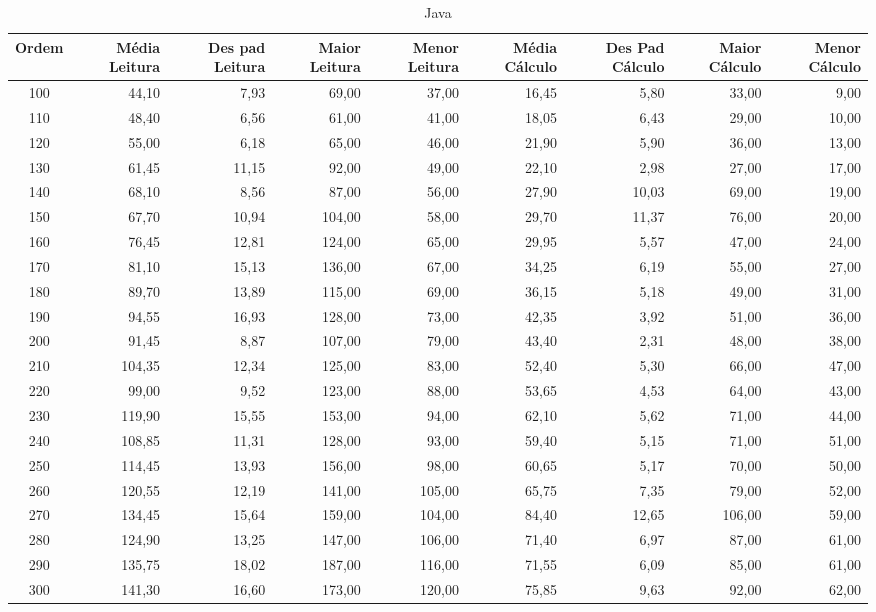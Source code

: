 \begin{landscape}
	\begin{table}[ht]
	\centering
	\begin{tabular}{| c | r | r | r | r | r | r | r | r | }
\hline
Ordem&Média Leitura&Des pad Leitura&Maior Leitura&Menor Leitura&Média Cálculo&Des Pad Cálculo&Maior Cálculo&Menor Cálculo\\ \hline 
		100&44,10&7,93&69,00&37,00&16,45&5,80&33,00&9,00\\
		110&48,40&6,56&61,00&41,00&18,05&6,43&29,00&10,00\\
		120&55,00&6,18&65,00&46,00&21,90&5,90&36,00&13,00\\
		130&61,45&11,15&92,00&49,00&22,10&2,98&27,00&17,00\\
		140&68,10&8,56&87,00&56,00&27,90&10,03&69,00&19,00\\
		150&67,70&10,94&104,00&58,00&29,70&11,37&76,00&20,00\\
		160&76,45&12,81&124,00&65,00&29,95&5,57&47,00&24,00\\
		170&81,10&15,13&136,00&67,00&34,25&6,19&55,00&27,00\\
		180&89,70&13,89&115,00&69,00&36,15&5,18&49,00&31,00\\
		190&94,55&16,93&128,00&73,00&42,35&3,92&51,00&36,00\\
		200&91,45&8,87&107,00&79,00&43,40&2,31&48,00&38,00\\
		210&104,35&12,34&125,00&83,00&52,40&5,30&66,00&47,00\\
		220&99,00&9,52&123,00&88,00&53,65&4,53&64,00&43,00\\
		230&119,90&15,55&153,00&94,00&62,10&5,62&71,00&44,00\\
		240&108,85&11,31&128,00&93,00&59,40&5,15&71,00&51,00\\
		250&114,45&13,93&156,00&98,00&60,65&5,17&70,00&50,00\\
		260&120,55&12,19&141,00&105,00&65,75&7,35&79,00&52,00\\
		270&134,45&15,64&159,00&104,00&84,40&12,65&106,00&59,00\\
		280&124,90&13,25&147,00&106,00&71,40&6,97&87,00&61,00\\
		290&135,75&18,02&187,00&116,00&71,55&6,09&85,00&61,00\\
		300&141,30&16,60&173,00&120,00&75,85&9,63&92,00&62,00\\
\hline
	\end{tabular}
	\caption{Java}
	\label{tabela_java}
	\end{table}
\end{landscape}

